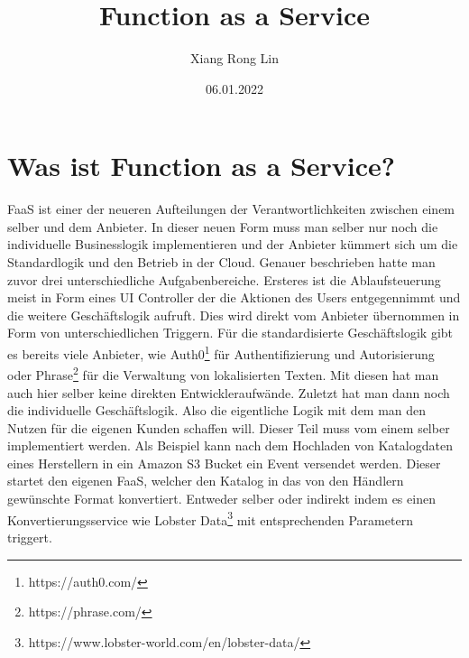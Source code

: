 \documentclass[12pt, a4paper]{article}
\title{Function as a Service}
\author{Xiang Rong Lin}
\date{06.01.2022}
\begin{document}
\maketitle



\newpage
\tableofcontents

\newpage

\section{Was ist Function as a Service?}
\ac{FaaS} ist einer der neueren Aufteilungen der Verantwortlichkeiten zwischen einem selber und dem Anbieter.
In dieser neuen Form muss man selber nur noch die individuelle Businesslogik implementieren und der Anbieter kümmert sich um die Standardlogik und den Betrieb in der Cloud.
Genauer beschrieben hatte man zuvor drei unterschiedliche Aufgabenbereiche\cite{serverless2017roewekamp}.
\newline
Ersteres ist die Ablaufsteuerung meist in Form eines UI Controller der die Aktionen des Users entgegennimmt und die weitere Geschäftslogik aufruft.
Dies wird direkt vom Anbieter übernommen in Form von unterschiedlichen Triggern.
\newline
Für die standardisierte Geschäftslogik gibt es bereits viele Anbieter, wie Auth0\footnote{https://auth0.com/} für Authentifizierung und Autorisierung oder Phrase\footnote{https://phrase.com/} für die Verwaltung von lokalisierten Texten.
Mit diesen hat man auch hier selber keine direkten Entwickleraufwände.
\newline
Zuletzt hat man dann noch die individuelle Geschäftslogik.
Also die eigentliche Logik mit dem man den Nutzen für die eigenen Kunden schaffen will.
Dieser Teil muss vom einem selber implementiert werden.
Als Beispiel kann nach dem Hochladen von Katalogdaten eines Herstellern in ein Amazon S3 Bucket ein Event versendet werden.
Dieser startet den eigenen \ac{FaaS}, welcher den Katalog in das von den Händlern gewünschte Format konvertiert.
Entweder selber oder indirekt indem es einen Konvertierungsservice wie Lobster Data\footnote{https://www.lobster-world.com/en/lobster-data/} mit entsprechenden Parametern triggert.
\end{document}
